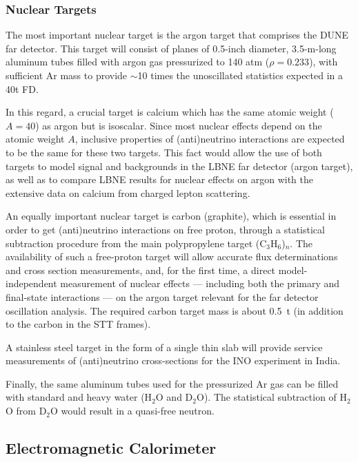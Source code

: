 \subsubsection{Nuclear Targets} 

The most important nuclear target is the argon target that comprises the DUNE far detector.
This target will consist of planes of 0.5-inch diameter, 3.5-m-long aluminum tubes filled
with argon gas pressurized to 140 atm ($\rho = 0.233$), with sufficient Ar mass to provide 
$\sim$10 times the unoscillated statistics expected in a 40t FD. 

In this regard, a crucial target is calcium which has the same atomic weight ($A=40$) 
as argon but is isoscalar. 
Since most nuclear effects depend on the atomic weight
$A$, inclusive properties of (anti)neutrino interactions are expected
to be the same for these two targets.
This fact would allow the use of both targets to model signal and
backgrounds in the LBNE far detector (argon target), as well as to
compare LBNE results for nuclear effects on argon with the extensive
data on calcium from charged lepton scattering. 


An equally important nuclear target is carbon (graphite), which is essential in order to
get (anti)neutrino interactions on free proton, through a statistical
subtraction procedure from the main polypropylene target (C$_3$H$_6$)$_n$. 
The availability of such a free-proton target will allow 
accurate flux determinations and cross section measurements, and, for the first time, 
a direct model-independent measurement of nuclear effects --- including
both the primary and final-state interactions --- on the argon target
relevant for the far detector oscillation analysis. The required carbon target mass 
is about 0.5~t (in addition to the carbon in the STT frames).  

A stainless steel target in the form of a single thin slab will provide 
service measurements of (anti)neutrino cross-sections for the INO experiment in India. 

Finally, the same aluminum tubes used for the pressurized Ar gas can be filled with 
standard and heavy water (H$_2$O and D$_2$O). The statistical subtraction of H$_2$O from 
D$_2$O would result in a quasi-free neutron. 



\subsection{Electromagnetic Calorimeter}
\label{cdrsec:detectors-nd-ref-fgt-ecal}

